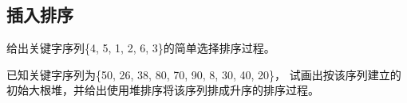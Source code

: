 \subsection{插入排序}

\begin{qitems}
    \begin{bbox}
        \qitem 给出关键字序列\{4, 5, 1, 2, 6, 3\}的简单选择排序过程。
    \end{bbox}
    \begin{bbox}
        \qitem 已知关键字序列为\{50, 26, 38, 80, 70, 90, 8, 30, 40, 20\}，
        试画出按该序列建立的初始大根堆，并给出使用堆排序将该序列排成升序的排序过程。
    \end{bbox}
\end{qitems} 